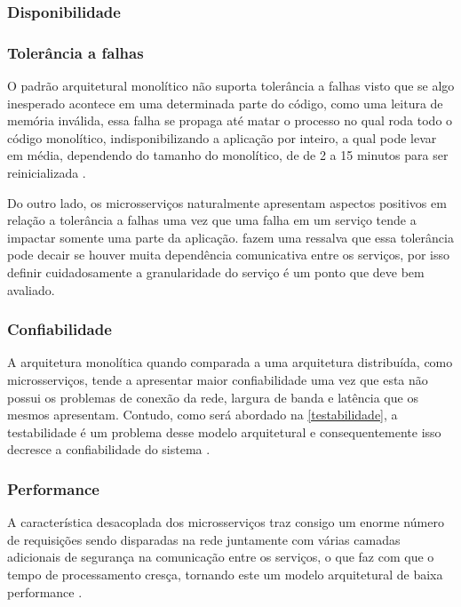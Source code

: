 \subsubsection{Disponibilidade}

\subsubsection{Tolerância a falhas}

O padrão arquitetural monolítico não suporta tolerância a falhas visto que se algo inesperado
acontece em uma determinada parte do código, como uma leitura de memória inválida, essa falha se
propaga até matar o processo no qual roda todo o código monolítico, indisponibilizando a
aplicação por inteiro, a qual pode levar em média, dependendo do tamanho do monolítico, de de 2 a
15 minutos para ser reinicializada \cite{Richards2020:FundamentalsOfSoftwareArchitecture}.

Do outro lado, os microsserviços naturalmente apresentam aspectos positivos em relação a tolerância
a falhas uma vez que uma falha em um serviço tende a impactar somente uma parte da aplicação.
 fazem uma ressalva que essa tolerância pode
decair se houver muita dependência comunicativa entre os serviços, por isso definir cuidadosamente a
granularidade do serviço é um ponto que deve bem avaliado.

\subsubsection{Confiabilidade}

A arquitetura monolítica quando comparada a uma arquitetura distribuída, como microsserviços, tende
a apresentar maior confiabilidade uma vez que esta não possui os problemas de conexão da rede,
largura de banda e latência que os mesmos apresentam. Contudo, como será abordado na
\autoref{testabilidade}, a testabilidade é um problema desse modelo arquitetural e consequentemente
isso decresce a confiabilidade do sistema \cite{Richards2020:FundamentalsOfSoftwareArchitecture}.

\subsubsection{Performance}

A característica desacoplada dos microsserviços traz consigo um enorme número de requisições
sendo disparadas na rede juntamente com várias camadas adicionais de segurança na comunicação entre
os serviços, o que faz com que o tempo de processamento cresça, tornando este um modelo arquitetural
de baixa performance \cite{Richards2020:FundamentalsOfSoftwareArchitecture}.

